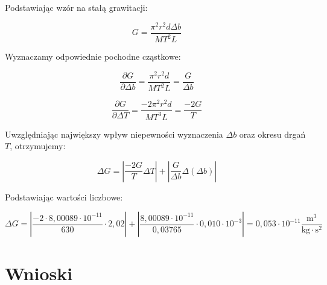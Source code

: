 \documentclass[a4paper,12pt]{article}
\begin{document}
Podstawiając wzór na stałą grawitacji:

\begin{equation*}
    \label{eq:g}
    G = \frac{\pi^2 r^2 d \Delta b}{MT^2L}
\end{equation*}

Wyznaczamy odpowiednie pochodne cząstkowe:

\begin{equation*}
    \frac{\partial G}{\partial \Delta b} = \frac{\pi^2 r^2 d}{MT^2L} = \frac{G}{\Delta b}
\end{equation*}

\begin{equation*}
    \frac{\partial G}{\partial \Delta T} = \frac{-2\pi^2 r^2 d}{MT^3L} = \frac{-2G}{T}
\end{equation*}

Uwzględniając największy wpływ niepewności wyznaczenia $\Delta b$ oraz okresu drgań $T$, otrzymujemy:

\begin{equation*}
    \Delta G = | \frac{-2G}{T} \Delta T | + | \frac{G}{\Delta b} \Delta( \Delta b ) |
\end{equation*}

Podstawiając wartości liczbowe:

\begin{equation*}
    \Delta G = | \frac{-2 \cdot 8{,}00089 \cdot 10^{-11}}{630} \cdot 2{,}02 | + | \frac{8{,}00089 \cdot 10^{-11}}{0{,}03765} \cdot 0{,}010 \cdot 10^{-3} |
    = 0{,}053 \cdot 10^{-11} \frac{\text{m}^3}{\text{kg} \cdot \text{s}^2}
\end{equation*}



\section{Wnioski}
\end{document}
